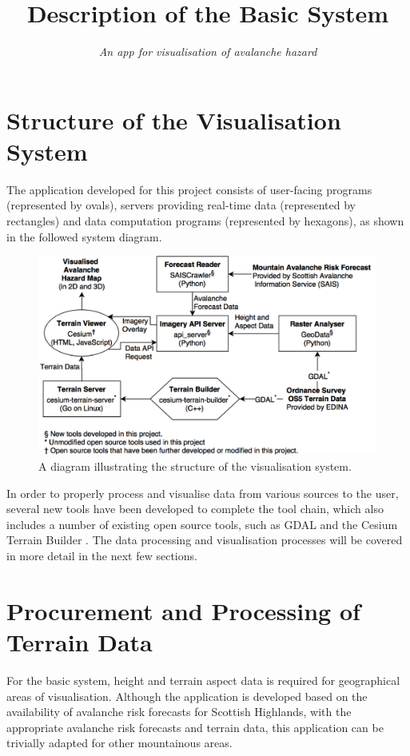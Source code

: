 \documentclass[11pt, oneside]{article}
\title{\vspace{-1.6cm}Description of the Basic System}
\author{\textit{An app for visualisation of avalanche hazard}}
\date{}
\begin{document}
\maketitle

\section{Structure of the Visualisation System}

The application developed for this project consists of user-facing programs (represented by ovals), servers providing real-time data (represented by rectangles) and data computation programs (represented by hexagons), as shown in the followed system diagram.

\begin{figure}[h]
\centering
\includegraphics[scale=0.3]{System.png}
\caption{A diagram illustrating the structure of the visualisation system.}
\end{figure}

In order to properly process and visualise data from various sources to the user, several new tools have been developed to complete the tool chain, which also includes a number of existing open source tools, such as GDAL\cite{GDAL} and the Cesium Terrain Builder \cite{cesium-terrain-builder}. The data processing and visualisation processes will be covered in more detail in the next few sections.

\section{Procurement and Processing of Terrain Data}
	For the basic system, height and terrain aspect data is required for geographical areas of visualisation. Although the application is developed based on the availability of avalanche risk forecasts for Scottish Highlands, with the appropriate avalanche risk forecasts and terrain data, this application can be trivially adapted for other mountainous areas.
	
\end{document}
